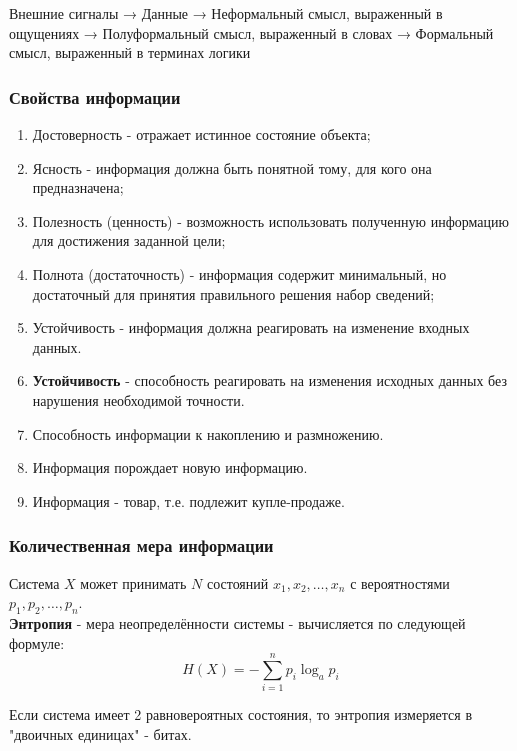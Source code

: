 Внешние сигналы 
→ Данные 
→ Неформальный смысл, выраженный в ощущениях 
→ Полуформальный смысл, выраженный в словах 
→ Формальный смысл, выраженный в терминах логики

\subsubsection{Свойства информации}
\begin{enumerate}  
  \item Достоверность - отражает истинное состояние объекта;
  \item Ясность - информация должна быть понятной тому, для кого она предназначена;
  \item Полезность (ценность) - возможность использовать полученную информацию для достижения заданной цели;
  \item Полнота (достаточность) - информация содержит минимальный, но достаточный для принятия правильного решения набор сведений;
  \item Устойчивость - информация должна реагировать на изменение входных данных.
  \item \textbf{Устойчивость} - способность реагировать на изменения исходных данных без нарушения необходимой точности.
  \item Способность информации к накоплению и размножению.
  \item Информация порождает новую информацию.
  \item Информация - товар, т.е. подлежит купле-продаже.
\end{enumerate} 

\subsubsection{Количественная мера информации}

Система $X$ может принимать $N$ состояний $x_1, x_2, \ldots, x_{n}$ с вероятностями $p_1, p_2, \ldots, p_n$. \\
\textbf{Энтропия} - мера неопределённости системы - вычисляется по следующей формуле: \[
H(X) = - \sum_{i=1}^{n} p_i \log_a p_i
\]  

Если система имеет 2 равновероятных состояния, то энтропия измеряется в "двоичных единицах" - битах.

